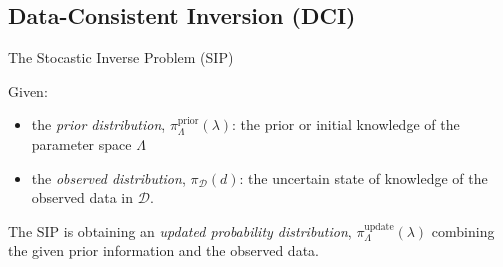 \documentclass[11pt]{beamer}
\begin{document}
\subsection{Data-Consistent Inversion (DCI)}

\begin{frame}

\begin{block}{The Stocastic Inverse Problem (SIP) \footnotemark[1]\footnotemark[2]\footnotemark[3]}
	
Given:
\begin{itemize}
\item  the \emph{prior distribution}, $\pi_\Lambda^\text{prior}(\lambda)$:  the prior or initial knowledge of the parameter space $\Lambda$ 
\item the \emph{observed distribution}, $\pi_\mathcal{D}(d)$:  the uncertain state of knowledge of the observed data in $\mathcal{D}$.
\end{itemize}

The SIP is obtaining an \emph{updated probability distribution}, $\pi_\Lambda^\text{update}(\lambda)$ combining the given prior information and the observed data.

\end{block}


	
\end{frame}
\end{document}
